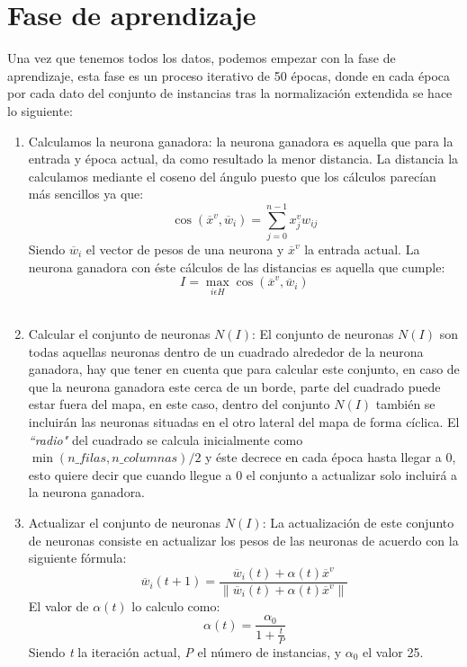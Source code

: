\documentclass[paper=a4, fontsize=12pt]{scrartcl}
\begin{document}
\section{Fase de aprendizaje}
Una vez que tenemos todos los datos, podemos empezar con la fase de aprendizaje, esta fase es un proceso iterativo de 50 épocas, donde en cada época por cada dato del conjunto de instancias tras la normalización extendida se hace lo siguiente:\\

\begin{enumerate}
	\item Calculamos la neurona ganadora: la neurona ganadora es aquella que para la entrada y época actual, da como resultado la menor distancia. La distancia la calculamos mediante el coseno del ángulo puesto que los cálculos parecían más sencillos ya que:
		\begin{equation} \label{dist_cos}
        	\cos(\overline{x}^{v}, \overline{w}_{i}) = \sum_{j=0}^{n-1}x_{j}^{v} w_{ij}
		\end{equation}
Siendo ${\overline{w}_{i}}$ el vector de pesos de una neurona y  ${\overline{x}^{v}}$ la entrada actual. La neurona ganadora con éste cálculos de las distancias es aquella que cumple:
		\begin{equation}
        	I = \max_{i \epsilon H}\cos(\overline{x}^{v}, \overline{w}_{i})
		\end{equation}\\
	\item Calcular el conjunto de neuronas ${N(I)}$: El conjunto de neuronas ${N(I)}$ son todas aquellas neuronas dentro de un cuadrado alrededor de la neurona ganadora, hay que tener en cuenta que para calcular este conjunto, en caso de que la neurona ganadora este cerca de un borde, parte del cuadrado puede estar fuera del mapa, en este caso, dentro del conjunto ${N(I)}$ también se incluirán las neuronas situadas en el otro lateral del mapa de forma cíclica. El \textit{``radio"} del cuadrado se calcula inicialmente como ${\min(n\_filas, n\_columnas) / 2}$ y éste decrece en cada época hasta llegar a 0, esto quiere decir que cuando llegue a 0 el conjunto a actualizar solo incluirá a la neurona ganadora.\\
    \item Actualizar el conjunto de neuronas ${N(I)}$: La actualización de este conjunto de neuronas consiste en actualizar los pesos de las neuronas de acuerdo con la siguiente fórmula:
		\begin{equation}
			\overline{w}_{i}(t+1) = \frac
			{ \overline{w}_{i}(t) + \alpha(t)\overline{x}^{v} }
			{ \| \overline{w}_{i}(t) + \alpha(t)\overline{x}^{v} \| }
		\end{equation}
	El valor de ${\alpha(t)}$ lo calculo como:
    	\begin{equation}
        	\alpha(t) = \frac{ \alpha_{0} }{ 1+\frac{t}{P} }
        \end{equation}
	Siendo \textit{t} la iteración actual, \textit{P} el número de instancias, y ${\alpha_{0}}$ el valor 25.\\
\end{enumerate}
\end{document}
